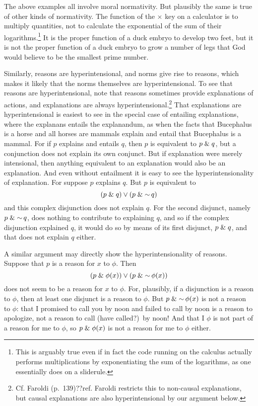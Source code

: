 The above examples all involve moral normativity. But plausibly the same is true of other kinds of normativity. The function of the
$\times$ key on a calculator is to multiply quantities, not to calculate the exponential of the sum of their logarithms.\footnote{This is arguably
true even if in fact the code running on the calculus actually performs multiplications by exponentiating the sum of the logarithms,
as one essentially does on a sliderule.} It is 
the proper function of a duck embryo to develop two feet, but  it is not the proper function of a duck embryo to grow a
number of legs that God would believe to be the smallest prime number.

Similarly, reasons are hyperintensional, and norms give rise to reasons, which makes it likely that the norms themselves are
hyperintensional. To see that reasons are hyperintensional, note that reasons sometimes provide explanations of actions, and 
explanations are always hyperintensional.\footnote{Cf. Faroldi (p.~139)??ref. Faroldi restricts this to non-causal explanations, but
causal explanations are also hyperintensional by our argument below.}
 That explanations are hyperintensional is easiest to see in the special case of entailing
explanations, where the explanans entails the explanandum, as when the facts that Bucephalus is a horse and all 
horses are mammals explain
and entail that Bucephalus is a mammal. For if $p$ explains and entails $q$, then $p$ is equivalent to $p\mathrel{\&} q$, but a 
conjunction does not explain its own conjunct. But if explanation were merely intensional, then anything equivalent to an 
explanation would also be an explanation. And even without entailment it is easy to see the hyperintensionality of
explanation. For suppose $p$ explains $q$. But $p$ is equivalent to
$$
(p\mathrel{\&} q)\vee (p\mathrel{\&}\operatorname{\sim} q)
$$
and this complex disjunction does not explain $q$. 
For the second disjunct, namely $p\mathrel{\&}\operatorname{\sim} q$, does nothing to contribute to explaining $q$, and so if the complex disjunction 
explained $q$, it would do so by means of its first disjunct, $p\mathrel{\&} q$, and that does not explain $q$ either.

A similar argument may directly show the hyperintensionality of reasons. Suppose that $p$ is a reason for $x$ to $\phi$. Then 
$$(p\mathrel{\&} \phi(x))\vee (p\mathrel{\&} \operatorname{\sim}\phi(x))$$ does not seem to be a reason for $x$ to $\phi$. For, plausibly, if a disjunction is a 
reason to $\phi$, then at least one disjunct is a reason to $\phi$. But $p\mathrel{\&} \operatorname{\sim}\phi(x)$ is not a reason to $\phi$: that I
promised to call you by noon and failed to call by noon is a reason to apologize, not a reason to call (have called?)\ by noon! And that I $\phi$ is not 
part of a reason for me to $\phi$, so $p\mathrel{\&}\phi(x)$ is not a reason for me to $\phi$ either.

